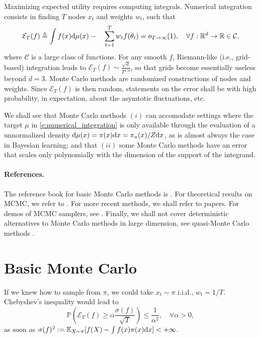 
Maximizing expected utility requires computing integrals. 
Numerical integration consists in finding $T$ nodes $x_t$ and weights $w_t$, such
that
$$
{\mathcal{E}_T(f)} \triangleq  \int f(x)\mathrm{d}\mu(x)  - \quad \sum_{t=1}^T w_t f(\theta_t) = o_{T\rightarrow \infty}(1), \quad \forall
f:\mathbb{R}^d\rightarrow\mathbb{R}\in\mathcal C,
$$
where $\mathcal C$ is a large class of functions.
For any smooth $f$, Riemann-like (i.e., grid-based) integration leads to $\mathcal{E}_T(f) \sim \frac{\sqrt{d}}{T^{1/d}}$, so that grids become essentially useless beyond $d=3$.
Monte Carlo methods are randomized constructions of nodes and weights. 
Since $\mathcal{E}_T(f)$ is then random, statements on the error shall be with high probability, in expectation, about the asymtotic fluctuations, etc.

We shall see that Monte Carlo methods $(i)$ can accomodate settings where the target $\mu$ in \eqref{e:numerical_integration} is only available through the evaluation of a unnormalized density $\mathrm{d}\mu(x) = \pi(x)\mathrm{d} x = \pi_u(x)/Z\mathrm{d} x$, as is almost always the case in Bayesian learning; and that $(ii)$ some Monte Carlo methods have an error that scales only polynomially with the dimension of the support of the integrand.

\paragraph{References.} 
The reference book for basic Monte Carlo methods is \citep{RoCa04}. 
For theoretical results on MCMC, we refer to \citep[Chapters 5 to 7]{DoMoSt14}. 
For more recent methods, we shall refer to papers.
For demos of MCMC samplers, see \cfdemo.
Finally, we shall not cover deterministic alternatives to Monte Carlo methods in large dimension, see quasi-Monte Carlo methods \citep{DiPi10}.

\section{Basic Monte Carlo}

If we knew how to sample from $\pi$, we could take $x_t\sim\pi$ i.i.d., $w_t=1/T$.
Chebyshev's inequality would lead to
  $$ \mathbb{P}\left({\mathcal{E}_T(f)} \geq \alpha\frac{\sigma(f)}{\sqrt{T}} \right) \leq \frac{1}{\alpha^2}, \quad \forall \alpha>0,$$
  as soon as $\sigma(f)^2 := \mathbb{E}_{X\sim\pi} [f(X) - \int f(x)\pi(x)\mathrm{d} x]<+\infty$.

